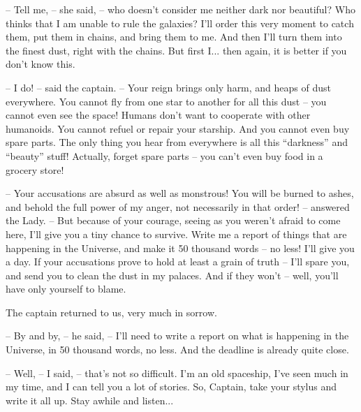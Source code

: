 \documentclass[ebook,twoside,final,openright]{memoir}
\begin{document}
– Tell me, – she said, – who doesn’t consider me neither dark nor beautiful? Who thinks that I am unable to rule the galaxies? I’ll order this very moment to catch them, put them in chains, and bring them to me. And then I’ll turn them into the finest dust, right with the chains. But first I... then again, it is better if you don’t know this.\par
– I do! – said the captain. – Your reign brings only harm, and heaps of dust everywhere. You cannot fly from one star to another for all this dust – you cannot even see the space! Humans don’t want to cooperate with other humanoids. You cannot refuel or repair your starship. And you cannot even buy spare parts. The only thing you hear from everywhere is all this “darkness” and “beauty” stuff! Actually, forget spare parts – you can’t even buy food in a grocery store!\par
– Your accusations are absurd as well as monstrous! You will be burned to ashes, and behold the full power of my anger, not necessarily in that order! – answered the Lady. – But because of your courage, seeing as you weren’t afraid to come here, I'll give you a tiny chance to survive. Write me a report of things that are happening in the Universe, and make it 50 thousand words – no less! I’ll give you a day. If your accusations prove to hold at least a grain of truth – I'll spare you, and send you to clean the dust in my palaces. And if they won’t – well, you’ll have only yourself to blame.\par
\par
The captain returned to us, very much in sorrow.\par
– By and by, – he said, – I’ll need to write a report on what is happening in the Universe, in 50 thousand words, no less. And the deadline is already quite close.\par
– Well, – I said, – that’s not so difficult. I'm an old spaceship, I’ve seen much in my time, and I can tell you a lot of stories. So, Captain, take your stylus and write it all up. Stay awhile and listen...
\end{document}
